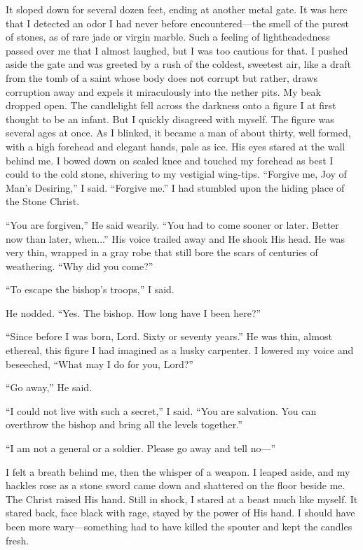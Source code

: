 It sloped down for several dozen feet, ending at another metal gate. It was here that I detected an odor I had never before encountered—the smell of the purest of stones, as of rare jade or virgin marble. Such a feeling of lightheadedness passed over me that I almost laughed, but I was too cautious for that. I pushed aside the gate and was greeted by a rush of the coldest, sweetest air, like a draft from the tomb of a saint whose body does not corrupt but rather, draws corruption away and expels it miraculously into the nether pits. My beak dropped open. The candlelight fell across the darkness onto a figure I at first thought to be an infant. But I quickly disagreed with myself. The figure was several ages at once. As I blinked, it became a man of about thirty, well formed, with a high forehead and elegant hands, pale as ice. His eyes stared at the wall behind me. I bowed down on scaled knee and touched my forehead as best I could to the cold stone, shivering to my vestigial wing-tips. “Forgive me, Joy of Man’s Desiring,” I said. “Forgive me.” I had stumbled upon the hiding place of the Stone Christ.

“You are forgiven,” He said wearily. “You had to come sooner or later. Better now than later, when...” His voice trailed away and He shook His head. He was very thin, wrapped in a gray robe that still bore the scars of centuries of weathering. “Why did you come?”

“To escape the bishop’s troops,” I said.

He nodded. “Yes. The bishop. How long have I been here?”

“Since before I was born, Lord. Sixty or seventy years.” He was thin, almost ethereal, this figure I had imagined as a husky carpenter. I lowered my voice and beseeched, “What may I do for you, Lord?”

“Go away,” He said.

“I could not live with such a secret,” I said. “You are salvation. You can overthrow the bishop and bring all the levels together.”

“I am not a general or a soldier. Please go away and tell no—”

I felt a breath behind me, then the whisper of a weapon. I leaped aside, and my hackles rose as a stone sword came down and shattered on the floor beside me. The Christ raised His hand. Still in shock, I stared at a beast much like myself. It stared back, face black with rage, stayed by the power of His hand. I should have been more wary—something had to have killed the spouter and kept the candles fresh.

